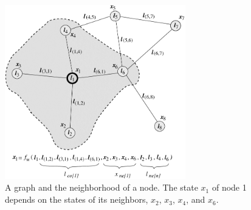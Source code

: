 \documentclass[12pt]{article}
\begin{document}
    \begin{figure}[t]
        \centering
        \includegraphics[width=0.7\textwidth]{img/A-graph-and-the-neighborhood-of-a-node-The-state-x-1-of-node-1-depends-on-the.png}
        \caption{A graph and the neighborhood of a node. The state $x_1$ of node 1 depends on the states of its neighbors, $x_2$, $x_3$, $x_4$, and $x_6$.}
        \label{fig:local_functions}
    \end{figure}
\end{document}
